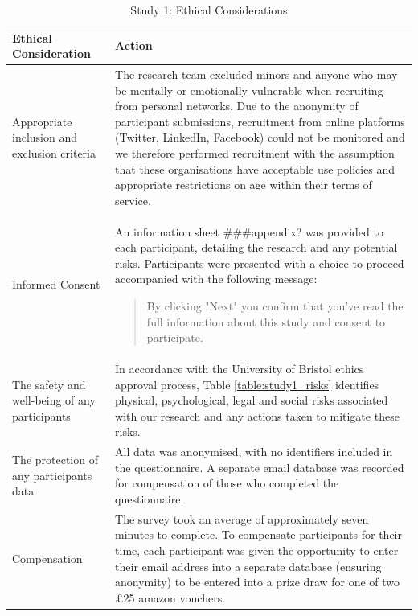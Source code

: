 \documentclass[manuscript,screen,review]{acmart}
\begin{document}
\begin{table}[h]
\begin{center}
\begin{tabular}{ | p{3cm} | p{11cm} |}
\hline
 Ethical Consideration & Action \\
 \hline
 \hline
 Appropriate inclusion and exclusion criteria & The research team excluded minors and anyone who may be mentally or emotionally vulnerable when recruiting from personal networks. Due to the anonymity of participant submissions, recruitment from online platforms (Twitter, LinkedIn, Facebook) could not be monitored and we therefore performed recruitment with the assumption that these organisations have acceptable use policies and appropriate restrictions on age within their terms of service.\\
 \hline
Informed Consent & An information sheet ###appendix? was provided to each participant, detailing the research and any potential risks. Participants were presented with a choice to proceed accompanied with the following message:

\begin{quote}
    By clicking "Next" you confirm that you've read the full information about this study and consent to participate.
\end{quote} \\
 \hline
 The safety and well-being of any participants & In accordance with the University of Bristol ethics approval process, Table \ref{table:study1_risks} identifies physical, psychological, legal and social risks associated with our research and any actions taken to mitigate these risks. \\
\hline
The protection of any participants data & All data was anonymised, with no identifiers included in the questionnaire. A separate email database was recorded for compensation of those who completed the questionnaire. \\
\hline
Compensation & The survey took an average of approximately seven minutes to complete. To compensate participants for their time, each participant was given the opportunity to enter their email address into a separate database (ensuring anonymity) to be entered into a prize draw for one of two £25 amazon vouchers. \\
 \hline
\end{tabular}
\caption{Study 1: Ethical Considerations}
\label{table:study1_ethical_considerations}
\end{center}
\end{table}
\end{document}
